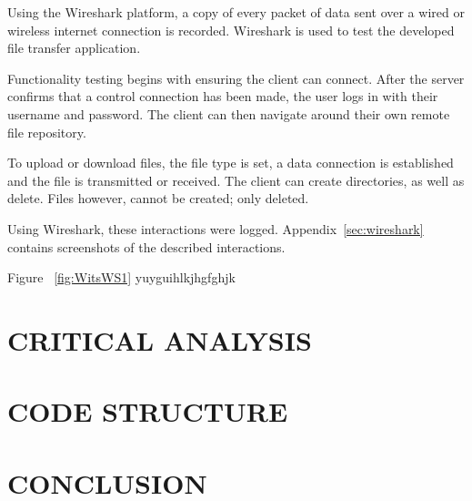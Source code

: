 \documentclass[10pt,twocolumn]{witseiepaper}
\begin{document}
Using the Wireshark platform, a copy of every packet of data sent over a wired or wireless internet connection is recorded. Wireshark is used to test the developed file transfer application.

Functionality testing begins with ensuring the client can connect. After the server confirms that a control connection has been made, the user logs in with their username and password. The client can then navigate around their own remote file repository. 

To upload or download files, the file type is set, a data connection is established and the file is transmitted or received. The client can create directories, as well as delete. Files however, cannot be created;  only deleted.

Using Wireshark, these interactions were logged. Appendix~\ref{sec:wireshark} contains screenshots of the described interactions. 

Figure ~\ref{fig:WitsWS1} yuyguihlkjhgfghjk
\section{CRITICAL ANALYSIS}

\section{CODE STRUCTURE}

\section{CONCLUSION}


%



\newpage
\onecolumn
\end{document}
